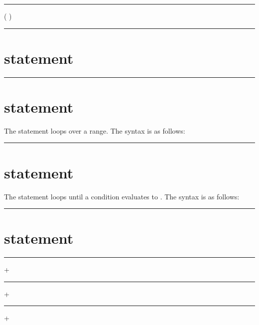 \begin{grammar}
\rule{if-statement}  \code{(}  \code{)}  ( )\optional\\
\rule{if-statement}  \code{(}  \code{)}   
\end{grammar}

\section{ statement}

\begin{grammar}
\rule{return-statement}   \code{;}
\end{grammar}

\section{ statement}

The  statement loops over a range. The syntax is as follows:

\begin{grammar}
\rule{for-statement}  \code{(}     \code{)} 
\end{grammar}

\section{ statement}

The  statement loops until a condition evaluates to .
The syntax is as follows:

\begin{grammar}
\rule{while-statement}  \code{(}  \code{)} 
\end{grammar}

\section{ statement}

\begin{grammar}
\rule{switch-statement}  \code{(}  \code{)} \code{\{} + \code{\}}\\
\rule{case}   \code{:} +\\
\rule{case}  \code{:} +
\end{grammar}

